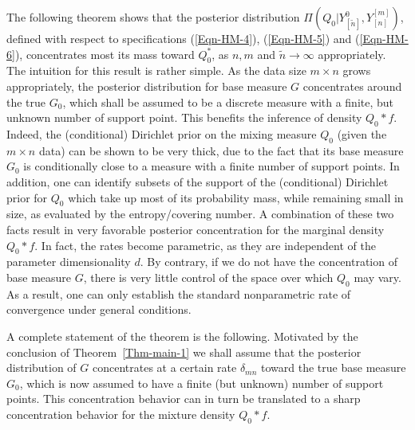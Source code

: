 \documentclass[MSNbibl,number,citesort]{arxbj}
\newcommand{\eqref}[1]{(\ref{#1})}
\def\comment{}
\newcommand{\DP}{\mathscr{D}}
\newcommand{\YYn}{Y_{[n]}}
\newcommand{\delmn}{\delta_{mn}}
\newcommand{\nn}{\tilde{n}}
\begin{document}

The following theorem shows that the posterior distribution
$\Pi(Q_0|Y_{[\nn]}^0,\YYn^{[m]})$, defined with respect to
specifications \eqref{Eqn-HM-4},
\eqref{Eqn-HM-5} and \eqref{Eqn-HM-6}, concentrates most its mass toward
$Q_0^*$, as $n, m$ and $\nn\rightarrow\infty$ appropriately.
The intuition for this result is rather simple. As the data size
$m\times n$
grows appropriately, the posterior distribution for base measure $G$
concentrates around the true $G_0$, which shall be assumed to be
a discrete measure with a finite, but unknown number of support point.
This benefits
the inference of density $Q_0*f$. Indeed,
the (conditional) Dirichlet prior on the mixing measure $Q_0$
(given the $m\times n$ data) can be shown to be very thick, due to
the fact that its base measure $G_0$ is conditionally close to a
measure with a finite number of support points. In addition,
one can identify subsets of the support of the (conditional)
Dirichlet prior for $Q_0$ which take up most of its probability mass,
while remaining small in size, as evaluated by the entropy/covering number.
A combination of these two
facts result in very favorable posterior concentration for the
marginal density $Q_0*f$. In fact, the rates become parametric,
as they are independent of the parameter dimensionality $d$.
By contrary, if we do not have the concentration of base measure $G$,
there is very little control of the space over which $Q_0$ may vary. As a
result, one can only establish the standard nonparametric rate of convergence
under general conditions.

A complete statement of the theorem is the following.
Motivated by the conclusion of Theorem~\ref{Thm-main-1} we shall
assume that
the posterior distribution of $G$ concentrates at a certain
rate $\delmn$ toward the true base measure $G_0$, which
is now assumed to have a finite (but unknown) number of support points.
This concentration behavior can in turn
be translated to a sharp concentration behavior for the mixture density
$Q_0*f$. %
\end{document}
